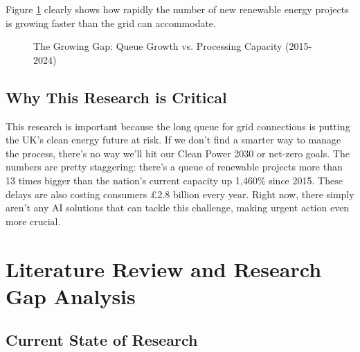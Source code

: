 \documentclass[12pt,a4paper]{article}
\begin{document}
Figure \ref{fig:crisis_visualization} clearly shows how rapidly the number of new renewable energy projects is growing faster than the grid can accommodate.

\begin{figure}[h]
\centering
{}
\caption{The Growing Gap: Queue Growth vs. Processing Capacity (2015-2024)}
\label{fig:crisis_visualization}
\end{figure}

\subsection{Why This Research is Critical}

This research is important because the long queue for grid connections is putting the UK's clean energy future at risk. If we don't find a smarter way to manage the process, there's no way we'll hit our Clean Power 2030 or net-zero goals. The numbers are pretty staggering: there's a queue of renewable projects more than 13 times bigger than the nation's current capacity up 1,460\% since 2015. These delays are also costing consumers £2.8 billion every year. Right now, there simply aren't any AI solutions that can tackle this challenge, making urgent action even more crucial.

\section{Literature Review and Research Gap Analysis}
\label{sec:literature}

\subsection{Current State of Research}
\end{document}
